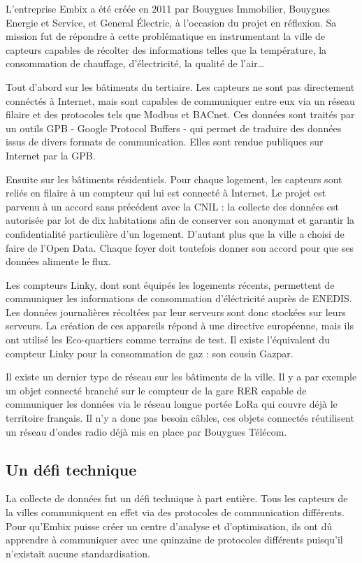 L'entreprise Embix a été créée en 2011 par Bouygues Immobilier, Bouygues Energie et Service, et General Électric,
à l'occasion du projet en réflexion. Sa mission fut de répondre
à cette problématique en instrumentant la ville de capteurs
capables de récolter des informations telles que la température, la consommation de chauffage, d'électricité,
la qualité de l'air\dots

Tout d'abord sur les bâtiments du tertiaire.
Les capteurs ne sont pas directement connéctés à Internet, mais sont capables de communiquer entre eux
via un réseau filaire et des protocoles tels que Modbus et BACnet.
Ces données sont traités par un outils GPB - Google Protocol Buffers - qui permet de traduire des données
issus de divers formats de communication. Elles sont rendue publiques sur Internet par la GPB.

Ensuite sur les bâtiments résidentiels. Pour chaque logement, les capteurs sont reliés en filaire à un compteur
qui lui est connecté à Internet.
Le projet est parvenu à un accord sans précédent avec la CNIL :
la collecte des données est autorisée par lot de dix habitations afin de conserver son anonymat et garantir
la confidentialité particulière d'un logement.
D'autant plus que la ville a choisi de faire de l'Open Data.
Chaque foyer doit toutefois donner son accord pour que ses données alimente le flux.

Les compteurs Linky, dont sont équipés les logements récents, permettent de communiquer les informations
de consommation d'éléctricité auprès de ENEDIS.
Les données journalières récoltées par leur serveurs sont donc stockées sur leurs serveurs.
La création de ces appareils répond à une directive européenne,
mais ils ont utilisé les Eco-quartiers comme terrains de test.
Il existe l'équivalent du compteur Linky pour la consommation de gaz : son cousin Gazpar.

Il existe un dernier type de réseau sur les bâtiments de la ville.
Il y a par exemple un objet connecté branché sur le compteur de la gare RER capable de
communiquer les données via le réseau longue portée LoRa qui couvre déjà le territoire français.
Il n'y a donc pas besoin câbles, ces objets connectés réutilisent un réseau d'ondes radio déjà mis en place par Bouygues Télécom.


\subsection{Un défi technique}

La collecte de données fut un défi technique à part entière.
Tous les capteurs de la villes communiquent en effet via des protocoles de communication différents.
Pour qu'Embix puisse créer un centre d'analyse et d'optimisation, ils ont dû apprendre
à communiquer avec une quinzaine de protocoles différents puisqu'il n'existait aucune standardisation.

